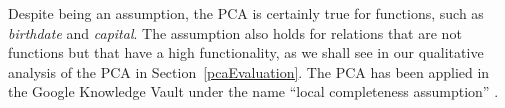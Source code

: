 Despite being an assumption, the PCA is certainly true for functions, such as \emph{birthdate} and \emph{capital}.
The assumption also holds for relations that are not functions but that have a high functionality,
as we shall see in our qualitative analysis of the PCA in Section~\ref{pcaEvaluation}. 
The PCA has been applied in the Google Knowledge Vault under the name ``local completeness assumption'' \cite{knowledgevault}.









%
